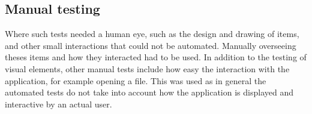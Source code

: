 \subsection{Manual testing}
\label{subsec:mamual_tests}

Where such tests needed a human eye, such as the design and drawing of items, and other small interactions that could not be automated. Manually overseeing theses items and how they interacted had to be used. In addition to the testing of visual elements, other manual tests include how easy the interaction with the application, for example opening a file. This was used as in general the automated tests do not take into account how the application is displayed and interactive by an actual user.
